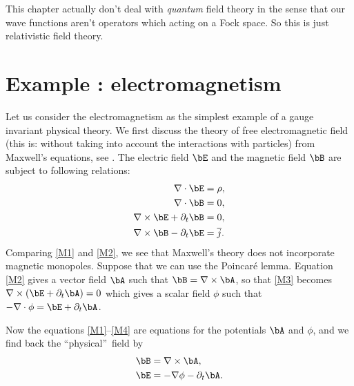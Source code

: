 
This chapter actually don't deal with \emph{quantum} field theory in the sense that our wave functions aren't operators which acting on a Fock space. So this is just relativistic field theory. 

\section{Example : electromagnetism}

Let us consider the electromagnetism as the simplest example of a gauge invariant physical theory. We first discuss the theory of free electromagnetic field (this is: without taking into account the interactions with particles) from Maxwell's equations, see \cite{Schomblond_em,llf}. The electric field $\bE$ and the magnetic field $\bB$ are subject to following relations:
\begin{subequations}
\begin{align}
\nabla\cdot{\bE}&=\rho,    \label{M1}\\
\nabla\cdot{\bB}&=0,                     \label{M2}  \\
\nabla\times{\bE}+\partial_t{\bB}&=0,         \label{M3}\\
\nabla\times{\bB}-\partial_t{\bE}&=\overline{ j }. \label{M4}
\end{align}
\end{subequations}
Comparing \eqref{M1} and \eqref{M2}, we see that Maxwell's theory does not incorporate magnetic monopoles.
Suppose that we can use the Poincaré lemma. Equation \eqref{M2} gives a vector field $\bA$ such that $\bB=\nabla\times\bA$, so that \eqref{M3} becomes $\nabla\times(\bE+\partial_t\bA)=0$ which gives a scalar field $\phi$ such that $-\nabla\cdot\phi=\bE+\partial_t\bA$.

Now the equations \eqref{M1}--\eqref{M4} are equations for the potentials $\bA$ and $\phi$, and we find back the ``physical''\ field by
\begin{subequations}\label{BE_de_A}
\begin{align}
    \bB&=\nabla\times\bA,\\
    \bE&=-\nabla\phi-\partial_t\bA.
\end{align}
\end{subequations}

